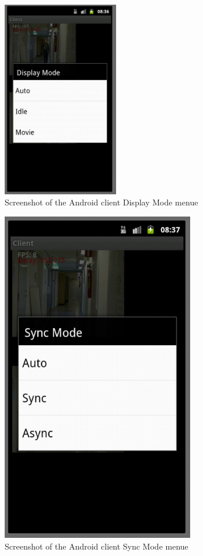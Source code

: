 \documentclass[8pt,titlepage]{article}
\begin{document}
\begin{figure}[hbp]
\includegraphics[width=0.45\textwidth]{../screenshots/androidDisplayMode.png}
\caption{Screenshot of the Android client Display Mode menue}
\end{figure}

\begin{figure}[hbp]
\includegraphics[width=0.75\textwidth]{../screenshots/androidSyncMode.png}
\caption{Screenshot of the Android client Sync Mode menue}
\end{figure}
\end{document}
